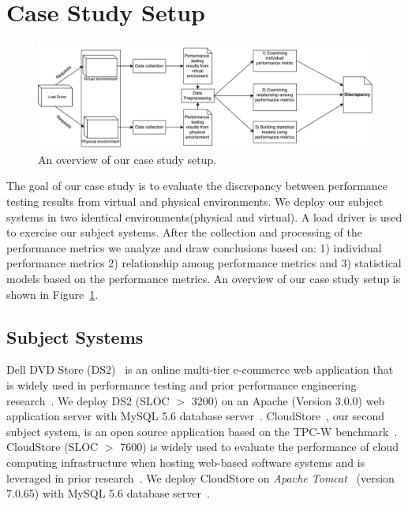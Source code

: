 \documentclass[smallextended]{svjour3}       %
\begin{document}
\section{Case Study Setup}
\label{sec:case}

\begin{figure}[thb]
	\includegraphics[width=.9\textwidth]{overview}
	\caption{An overview of our case study setup.}
	\label{fig:Approach}
\end{figure}

The goal of our case study is to evaluate the discrepancy between performance testing results from virtual and physical environments. We deploy our subject systems in two identical environments(physical and virtual). A load driver is used to exercise our subject systems. After the collection and processing of the performance metrics we analyze and draw conclusions based on: 1) individual performance metrics 2) relationship among performance metrics and 3) statistical models based on the performance metrics. An overview of our case study setup is shown in Figure~\ref{fig:Approach}.


\subsection{Subject Systems}
Dell DVD Store (DS2)~\cite{delldvd} is an online multi-tier e-commerce web application that is widely used in performance testing and prior performance engineering research~\cite{Shang:2015:ADP:2668930.2688052,Nguyen:2012:ADP:2188286.2188344, jackicsm2009}. We deploy DS2 (SLOC $>$ 3200) on an Apache (Version 3.0.0) web application server with MySQL 5.6 database server~\cite{mysql}. CloudStore~\cite{cloudstore}, our second subject system, is an open source application based on the TPC-W benchmark~\cite{tpcw}. CloudStore (SLOC $>$ 7600) is widely used to evaluate the performance of cloud computing infrastructure when hosting web-based software systems and is leveraged in prior research~\cite{tarekmsr16}. We deploy CloudStore on \textit{Apache Tomcat}~\cite{tomcat} (version 7.0.65) with MySQL 5.6 database server~\cite{mysql}.
\end{document}
